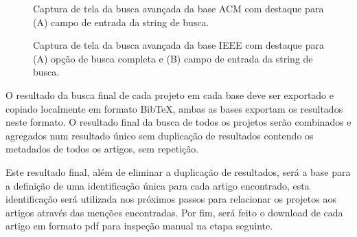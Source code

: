 \begin{figure}[h]
  \center
  \caption{Captura de tela da busca avançada da base ACM com destaque para (A) campo de entrada da string de busca.}
  \label{advanced-search-acm}
\end{figure}

\begin{figure}[h]
  \center
  \caption{Captura de tela da busca avançada da base IEEE com destaque para (A) opção de busca completa e (B) campo de entrada da string de busca.}
  \label{advanced-search-ieee}
\end{figure}

O resultado da busca final de cada projeto em cada base deve ser exportado e
copiado localmente em formato BibTeX, ambas as bases exportam os resultados
neste formato. O resultado final da busca de todos os projetos serão combinados
e agregados num resultado único sem duplicação de resultados contendo os
metadados de todos os artigos, sem repetição.

Este resultado final, além de eliminar a duplicação de resultados, será a base
para a definição de uma identificação única para cada artigo encontrado, esta
identificação será utilizada nos próximos passos para relacionar os projetos
aos artigos através das menções encontradas. Por fim, será feito o download de cada
artigo em formato pdf para inspeção manual na etapa seguinte.

